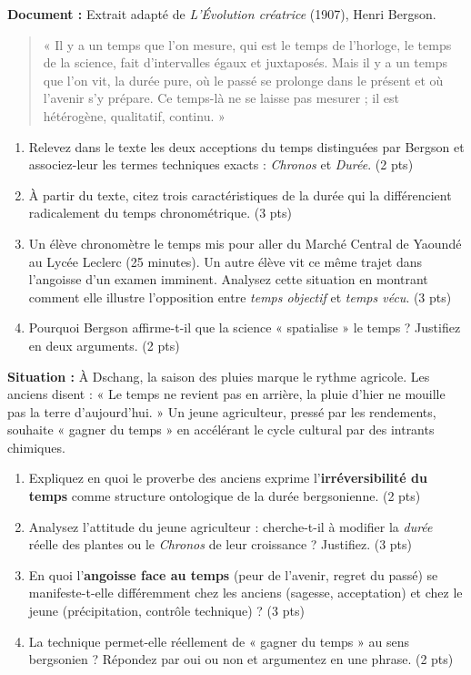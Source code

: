 \documentclass[11pt]{article}
\begin{document}
\begin{exercice}
\textbf{Document :} Extrait adapté de \textit{L'Évolution créatrice} (1907), Henri Bergson.
\begin{quote}
« Il y a un temps que l'on mesure, qui est le temps de l'horloge, le temps de la science, fait d'intervalles égaux et juxtaposés. Mais il y a un temps que l'on vit, la durée pure, où le passé se prolonge dans le présent et où l'avenir s'y prépare. Ce temps-là ne se laisse pas mesurer ; il est hétérogène, qualitatif, continu. »
\end{quote}
\begin{enumerate}
    \item Relevez dans le texte les deux acceptions du temps distinguées par Bergson et associez-leur les termes techniques exacts : \textit{Chronos} et \textit{Durée}. (2 pts)
    \item À partir du texte, citez trois caractéristiques de la durée qui la différencient radicalement du temps chronométrique. (3 pts)
    \item Un élève chronomètre le temps mis pour aller du Marché Central de Yaoundé au Lycée Leclerc (25 minutes). Un autre élève vit ce même trajet dans l'angoisse d'un examen imminent. Analysez cette situation en montrant comment elle illustre l'opposition entre \textit{temps objectif} et \textit{temps vécu}. (3 pts)
    \item Pourquoi Bergson affirme-t-il que la science « spatialise » le temps ? Justifiez en deux arguments. (2 pts)
\end{enumerate}
\end{exercice}

\begin{exercice}
\textbf{Situation :} À Dschang, la saison des pluies marque le rythme agricole. Les anciens disent : « Le temps ne revient pas en arrière, la pluie d'hier ne mouille pas la terre d'aujourd'hui. » Un jeune agriculteur, pressé par les rendements, souhaite « gagner du temps » en accélérant le cycle cultural par des intrants chimiques.
\begin{enumerate}
    \item Expliquez en quoi le proverbe des anciens exprime l'\textbf{irréversibilité du temps} comme structure ontologique de la durée bergsonienne. (2 pts)
    \item Analysez l'attitude du jeune agriculteur : cherche-t-il à modifier la \textit{durée} réelle des plantes ou le \textit{Chronos} de leur croissance ? Justifiez. (3 pts)
    \item En quoi l'\textbf{angoisse face au temps} (peur de l'avenir, regret du passé) se manifeste-t-elle différemment chez les anciens (sagesse, acceptation) et chez le jeune (précipitation, contrôle technique) ? (3 pts)
    \item La technique permet-elle réellement de « gagner du temps » au sens bergsonien ? Répondez par oui ou non et argumentez en une phrase. (2 pts)
\end{enumerate}
\end{exercice}
\end{document}
